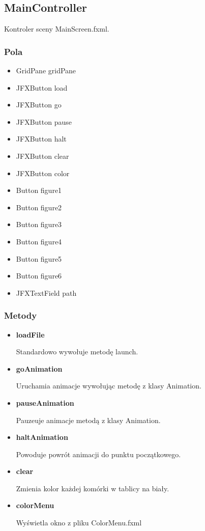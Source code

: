 \documentclass[a4paper,11pt]{article}
\begin{document}
\subsection{MainController}
Kontroler sceny MainScreen.fxml.
\subsubsection{Pola}
\begin{itemize}
\item GridPane gridPane
\item JFXButton load
\item JFXButton go
\item JFXButton pause
\item JFXButton halt
\item JFXButton clear
\item JFXButton color
\item Button figure1
\item Button figure2
\item Button figure3
\item Button figure4
\item Button figure5
\item Button figure6
\item JFXTextField path
\end{itemize}
\subsubsection{Metody}
\begin{itemize}
\item \textbf{loadFile}

Standardowo wywołuje metodę launch.
\item \textbf{goAnimation}

Uruchamia animacje wywołując metodę z klasy Animation.
\item \textbf{pauseAnimation}

Pauzeuje animacje metodą z klasy Animation.
\item \textbf{haltAnimation}

Powoduje powrót animacji do punktu początkowego.
\item \textbf{clear}

Zmienia kolor każdej komórki w tablicy na biały.
\item \textbf{colorMenu}

Wyświetla okno z pliku ColorMenu.fxml
\end{itemize}
\end{document}
